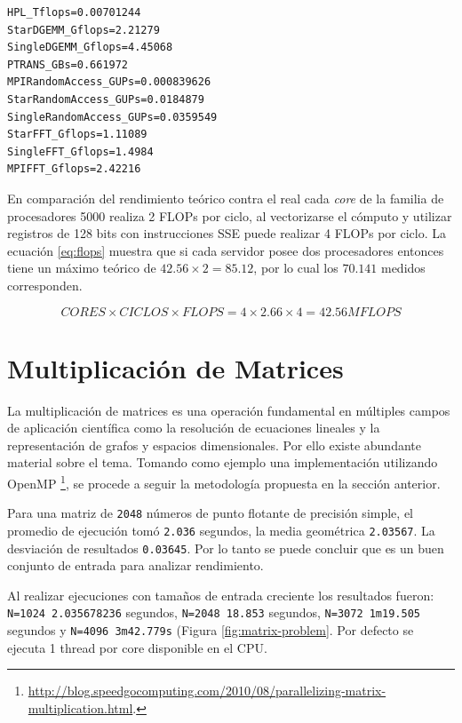 \documentclass[a4paper]{report}
\begin{document}
\label{table:pruebas}

\begin{verbatim}
HPL_Tflops=0.00701244
StarDGEMM_Gflops=2.21279
SingleDGEMM_Gflops=4.45068
PTRANS_GBs=0.661972
MPIRandomAccess_GUPs=0.000839626
StarRandomAccess_GUPs=0.0184879
SingleRandomAccess_GUPs=0.0359549
StarFFT_Gflops=1.11089
SingleFFT_Gflops=1.4984
MPIFFT_Gflops=2.42216
\end{verbatim}

En comparación del rendimiento teórico contra el real cada {\it core} de la familia de procesadores 5000 realiza 2 FLOPs por ciclo,
al vectorizarse el cómputo y utilizar registros de 128 bits con instrucciones SSE puede realizar 4 FLOPs por ciclo.
La ecuación \ref{eq:flops} muestra que si cada servidor posee dos procesadores entonces tiene un máximo teórico de $ 42.56 \times 2 = 85.12 $, por lo cual los $ 70.141 $ medidos corresponden.

\begin{equation}
\label{eq:flops}
CORES \times CICLOS \times FLOPS = 4 \times 2.66 \times 4 = 42.56 MFLOPS
\end{equation}

\section{Multiplicación de Matrices}

La multiplicación de matrices es una operación fundamental en múltiples campos de aplicación científica como la resolución de ecuaciones lineales y la representación de grafos y espacios dimensionales. Por ello existe abundante material sobre el tema. Tomando como ejemplo una implementación utilizando OpenMP \footnote{\href{http://blog.speedgocomputing.com/2010/08/parallelizing-matrix-multiplication.html}{http://blog.speedgocomputing.com/2010/08/parallelizing-matrix-multiplication.html}.}, se procede a seguir la metodología propuesta en la sección anterior. 

\bigskip

Para una matriz de {\tt 2048} números de punto flotante de precisión simple, el promedio de ejecución tomó {\tt 2.036} segundos, la media geométrica {\tt 2.03567}. La desviación de resultados {\tt 0.03645}. Por lo tanto se puede concluir que es un buen conjunto de entrada para analizar rendimiento.

\bigskip

Al realizar ejecuciones con tamaños de entrada creciente los resultados fueron: {\tt N=1024 2.035678236} segundos, {\tt N=2048 18.853} segundos, {\tt N=3072 1m19.505} segundos y {\tt N=4096 3m42.779s} (Figura \ref{fig:matrix-problem}. 
Por defecto se ejecuta 1 thread por core disponible en el CPU.
\end{document}
